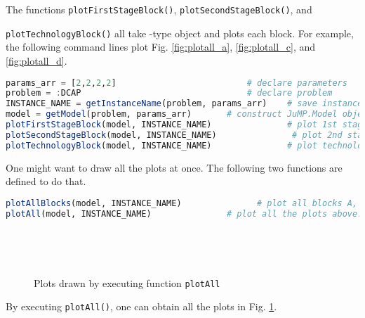 The functions \texttt{plotFirstStageBlock()}, \texttt{plotSecondStageBlock()}, and

\noindent\texttt{plotTechnologyBlock()} all take \jumpmodel-type object and plots each block. For example, the following command lines plot Fig. \ref{fig:plotall_a}, \ref{fig:plotall_c}, and \ref{fig:plotall_d}.
\begin{lstlisting}[frame=single,language=julia]
params_arr = [2,2,2,2]	                        # declare parameters
problem = :DCAP	                                # declare problem
INSTANCE_NAME = getInstanceName(problem, params_arr)	# save instance name
model = getModel(problem, params_arr)	    # construct JuMP.Model object
plotFirstStageBlock(model, INSTANCE_NAME)               # plot 1st stage block
plotSecondStageBlock(model, INSTANCE_NAME)               # plot 2nd stage block
plotTechnologyBlock(model, INSTANCE_NAME)               # plot technology block
\end{lstlisting}

One might want to draw all the plots at once. The following two functions are defined to do that.
\begin{lstlisting}[frame=single,language=julia]
plotAllBlocks(model, INSTANCE_NAME)               # plot all blocks A, W, and T, respectively
plotAll(model, INSTANCE_NAME)               # plot all the plots above: EF constraint matrix and blocks A, W, T
\end{lstlisting}
\begin{figure}[H]
	\centering
	~
	
	~
	
	\caption{Plots drawn by executing function \texttt{plotAll}}
	\label{fig:plotall}
\end{figure}
By executing \texttt{plotAll()}, one can obtain all the plots in Fig. \ref{fig:plotall}.

